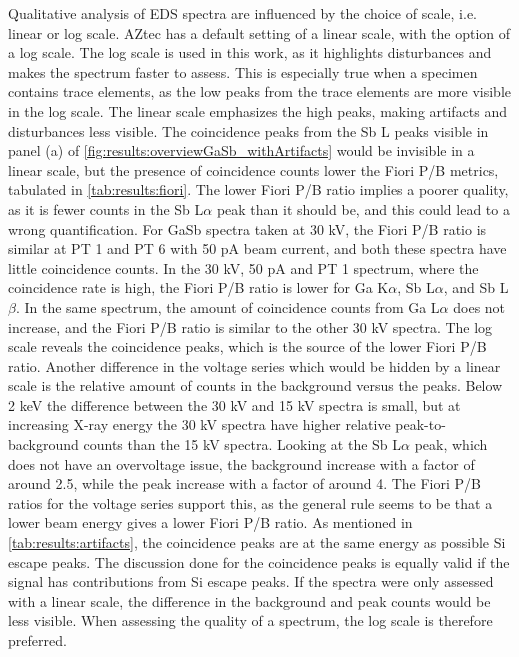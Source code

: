 Qualitative analysis of EDS spectra are influenced by the choice of scale, i.e. linear or log scale.
AZtec has a default setting of a linear scale, with the option of a log scale.
The log scale is used in this work, as it highlights disturbances and makes the spectrum faster to assess.
This is especially true when a specimen contains trace elements, as the low peaks from the trace elements are more visible in the log scale.
The linear scale emphasizes the high peaks, making artifacts and disturbances less visible.
The coincidence peaks from the Sb L peaks visible in panel (a) of \cref{fig:results:overviewGaSb_withArtifacts} would be invisible in a linear scale, but the presence of coincidence counts lower the Fiori P/B metrics, tabulated in \cref{tab:results:fiori}.
The lower Fiori P/B ratio implies a poorer quality, as it is fewer counts in the Sb L$\alpha$ peak than it should be, and this could lead to a wrong quantification.
For GaSb spectra taken at 30 kV, the Fiori P/B ratio is similar at PT 1 and PT 6 with 50 pA beam current, and both these spectra have little coincidence counts.
In the 30 kV, 50 pA and PT 1 spectrum, where the coincidence rate is high, the Fiori P/B ratio is lower for Ga K$\alpha$, Sb L$\alpha$, and Sb L$\beta$.
In the same spectrum, the amount of coincidence counts from Ga L$\alpha$ does not increase, and the Fiori P/B ratio is similar to the other 30 kV spectra.
The log scale reveals the coincidence peaks, which is the source of the lower Fiori P/B ratio.
Another difference in the voltage series which would be hidden by a linear scale is the relative amount of counts in the background versus the peaks.
Below 2 keV the difference between the 30 kV and 15 kV spectra is small, but at increasing X-ray energy the 30 kV spectra have higher relative peak-to-background counts than the 15 kV spectra.
Looking at the Sb L$\alpha$ peak, which does not have an overvoltage issue, the background increase with a factor of around 2.5, while the peak increase with a factor of around 4.
The Fiori P/B ratios for the voltage series support this, as the general rule seems to be that a lower beam energy gives a lower Fiori P/B ratio.
As mentioned in \cref{tab:results:artifacts}, the coincidence peaks are at the same energy as possible Si escape peaks.
The discussion done for the coincidence peaks is equally valid if the signal has contributions from Si escape peaks.
If the spectra were only assessed with a linear scale, the difference in the background and peak counts would be less visible.
When assessing the quality of a spectrum, the log scale is therefore preferred.


